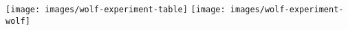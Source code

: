 \columnwidth
\texttt{[image: images/wolf-experiment-table]}%
\columnwidth
\texttt{[image: images/wolf-experiment-wolf]}%